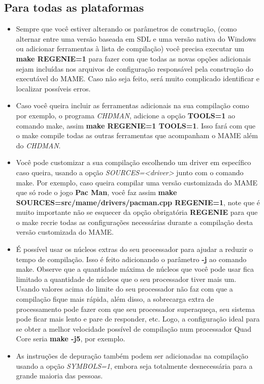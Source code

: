 \documentclass[letterpaper,10pt,brazil]{sphinxmanual}
\begin{document}
\subsection{Para todas as plataformas}
\label{initialsetup/compilingmame:para-todas-as-plataformas}\begin{itemize}
\item {} 
Sempre que você estiver alterando os parâmetros de construção, (como
alternar entre uma versão baseada em SDL e uma versão nativa do
Windows ou adicionar ferramentas à lista de compilação) você precisa
executar um \textbf{make REGENIE=1} para fazer com que todas as novas
opções adicionais sejam incluídas nos arquivos de configuração
responsável pela construção do executável do MAME. Caso não seja
feito, será muito complicado identificar e localizar possíveis
erros.

\item {} 
Caso você queira incluir as ferramentas adicionais na sua compilação
como por exemplo, o programa \emph{CHDMAN}, adicione a opção \textbf{TOOLS=1}
ao comando make, assim \textbf{make REGENIE=1 TOOLS=1}. Isso fará com que
o make compile todas as outras ferramentas que acompanham o MAME
além do \emph{CHDMAN}.

\item {} 
Você pode customizar a sua compilação escolhendo um driver em
específico caso queira, usando a opção \emph{SOURCES=\textless{}driver\textgreater{}} junto com
o comando make. Por exemplo, caso queira compilar uma versão
customizada do MAME que só rode o jogo \textbf{Pac Man}, você faz assim
\textbf{make SOURCES=src/mame/drivers/pacman.cpp REGENIE=1}, note que é
muito importante não se esquecer da opção obrigatória \textbf{REGENIE}
para que o make recrie todas as configurações necessárias durante a
compilação desta versão customizada do MAME.

\item {} 
É possível usar os núcleos extras do seu processador para ajudar a
reduzir o tempo de compilação. Isso é feito adicionando o parâmetro
\textbf{-j} ao comando make. Observe que a quantidade máxima de núcleos
que você pode usar fica limitado a quantidade de núcleos que o seu
processador tiver mais um. Usando valores acima do limite do seu
processador não faz com que a compilação fique mais rápida, além
disso, a sobrecarga extra de processamento pode fazer com que seu
processador superaqueça, seu sistema pode ficar mais lento e pare de
responder, etc. Logo, a configuração ideal para se obter a melhor
velocidade possível de compilação num processador Quad Core seria
\textbf{make -j5}, por exemplo.

\item {} 
As instruções de depuração também podem ser adicionadas na
compilação usando a opção \emph{SYMBOLS=1}, embora seja totalmente
desnecessária para a grande maioria das pessoas.

\end{itemize}
\end{document}
